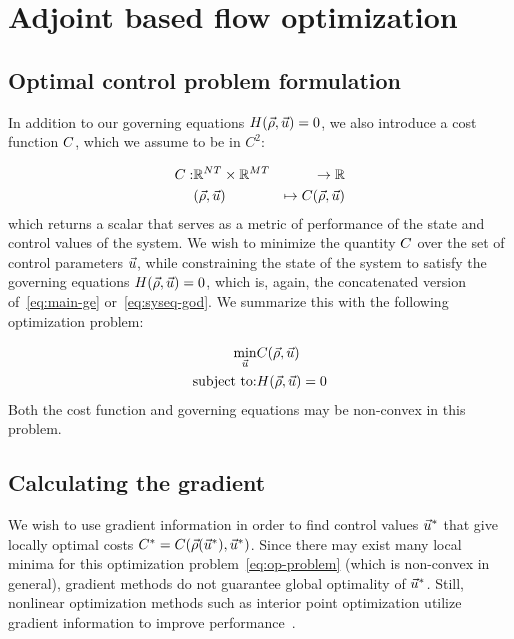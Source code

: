 \section{Adjoint based flow optimization\label{sec:Adjoint-method}}


\subsection{Optimal control problem formulation\label{par:Optimization-Problem}}

In addition to our governing equations $\sys\left(\state,\control\right)=0$,
we also introduce a cost function $C$, which we assume to be
in $C^{2}$:

\begin{eqnarray*}
	\cost: & \mathbb{R}^{\nlinks T}\times\mathbb{R}^{\ncontrols T} & \rightarrow\mathbb{R}\\
	& \left(\state,\control\right) & \mapsto\cost\left(\state,\control\right)
\end{eqnarray*}
which returns a scalar that serves as a metric of performance of the
state and control values of the system. We wish to minimize the quantity
$C$ over the set of control parameters $\vec{u}$, while constraining
the state of the system to satisfy the governing equations $\sys\left(\state,\control\right)=0$,
which is, again, the concatenated version of~\eqref{eq:main-ge} or~\eqref{eq:syseq-god}.
We summarize this with the following optimization problem:

\begin{eqnarray}
	\underset{\control}{\min} & \cost\left(\state,\control\right)\nonumber \\
	\text{subject to:} & \sys\left(\state,\control\right)=0\label{eq:op-problem}
\end{eqnarray}
Both the cost function and governing equations may be non-convex in
this problem.


\subsection{Calculating the gradient\label{par:Calculating-the-gradient}}

We wish to use gradient information in order to find control values
$\vec{u}^{*}$ that give locally optimal costs $\cost^{*}=\cost\left(\state\left(\control^{*}\right),\control^{*}\right)$.
Since there may exist many local minima for this optimization problem~\eqref{eq:op-problem}
(which is non-convex in general), gradient\emph{ }methods do not guarantee
global optimality of $\vec{u}^{*}$\emph{. }Still, nonlinear optimization
methods such as interior point optimization utilize gradient information
to improve performance~\cite{Andreas2005}.

